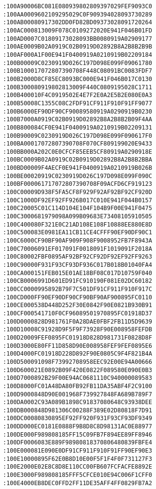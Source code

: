 \begin{lstlisting}[language={}, basicstyle=\scriptsize, caption=Машинний код]
:100A90006BC081E080939802809397029FEF9093C0
:100AA0009602109295029C0F909394028093730289
:100AB00080917302DD0FD82BD09373028091720264
:100AC000813009F078C0109272020E941F046B01FD
:100AD0007C01809173028093BB0080919A02909177
:100AE0009B02A0919C02B0919D02892B8A2B8B2B9B
:100AF000A1F00E941F0400919A0210919B02209184
:100B00009C0230919D026C197D098E099F09061780
:100B100017072807390708F448C08091BC0083FDF7
:100B2000D8CF85EC8093BC000E941F046B017C0130
:100B300080919802813009F440C0809195028C1711
:100B400010F4C0919502E4E7F2E0A2E5B2E080E0A3
:100B50008C1355C08C2FDF91CF911F910F91FF9077
:100B6000EF90DF90CF90089580919A0290919B0230
:100B7000A0919C02B0919D02892B8A2B8B2B09F4AA
:100B800084CF0E941F0400919A0210919B02209131
:100B90009C0230919D026C197D098E099F090617F0
:100BA00017072807390708F070CF809199020E9433
:100BB000A202C0E0CFCF85EEB5CF80919A0290918E
:100BC0009B02A0919C02B0919D02892B8A2B8B2BBA
:100BD00009F4AECF0E941F0400919A0210919B026B
:100BE00020919C0230919D026C197D098E099F090C
:100BF000061717072807390708F09ACFD6CF919123
:100C00009D938F5FA5CF8F929F92AF92BF92CF920D
:100C1000DF92EF92FF926B017C010E941F044B0157
:100C20005C01C114D104E104F104B9F00E941F0475
:100C3000681979098A099B09683E73408105910505
:100C400080F321E0C21AD108E108F10888EE880E8D
:100C500083E0981EA11CB11CE4CFFF90EF90DF90C1
:100C6000CF90BF90AF909F908F9008952FB7F8943A
:100C70006091EF017091F0018091F1019091F2018A
:100C80002FBF0895AF92BF92CF92DF92EF92FF9263
:100C90000F931F93CF93DF936C017B018B01040FA4
:100CA000151FEB015E01AE18BF08C017D10759F040
:100CB0006991D601ED91FC910190F081E02DC60182
:100CC0000995892B79F7C501DF91CF911F910F917C
:100CD000FF90EF90DF90CF90BF90AF900895FC0110
:100CE000538D448D252F30E0842F90E0821B930B91
:100CF000541710F0CF96089501970895FC01918D37
:100D0000828D981761F0A28DAE0FBF2FB11D5D9639
:100D10008C91928D9F5F9F73928F90E008958FEFDB
:100D20009FEF0895FC01918D828D981731F0828D8F
:100D3000E80FF11D858D90E008958FEF9FEF0895E6
:100D4000FC01918D228D892F90E0805C9F4F821B4A
:100D500091098F73992708958EEC92E00E94A00666
:100D600021E0892B09F420E0822F089580E090E0B3
:100D7000892B29F00E94AC0681110C940000089583
:100D8000FC01A48DA80FB92FB11DA35ABF4F2C9100
:100D9000848D90E001968F739927848FA689B789F7
:100DA0002C93A089B1898C91837080648C93938DEE
:100DB000848D981306C00288F389E02D80818F7D91
:100DC00080830895EF92FF920F931F93CF93DF9349
:100DD000EC0181E0888F9B8D8C8D98131AC0E88977
:100DE000F989808185FF15C09FB7F894EE89FF8946
:100DF0006083E889F98980818370806480839FBFE4
:100E000081E090E0DF91CF911F910F91FF90EF90E3
:100E10000895F62E0B8D10E00F5F1F4F0F731127F3
:100E2000E02E8C8D8E110CC00FB607FCFACFE8892E
:100E3000F989808185FFF5CFCE010E94C006F1CFF0
:100E4000EB8DEC0FFD2FF11DE35AFF4FF0829FB7A2

\end{lstlisting}
